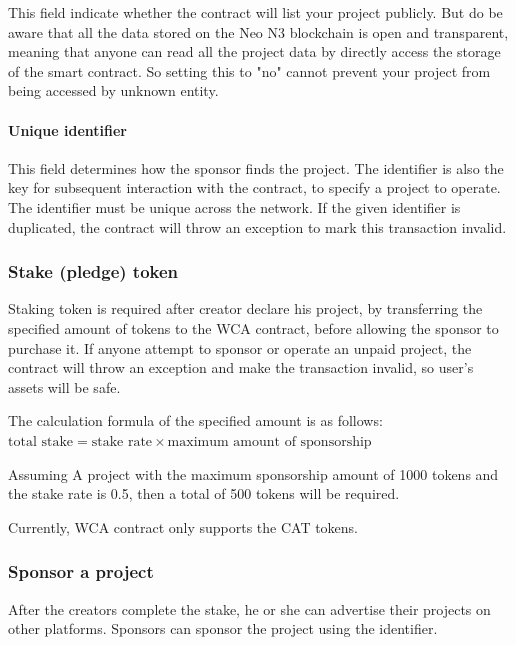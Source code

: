 \documentclass[12pt,a4paper]{article}
\begin{document}
    This field indicate whether the contract will list your project publicly.
    But do be aware that all the data stored on the Neo N3 blockchain is open and
    transparent, meaning that anyone can read all the project data by directly access
    the storage of the smart contract. So setting this to "no" cannot prevent your
    project from being accessed by unknown entity.

    \paragraph{Unique identifier}

    This field determines how the sponsor finds the project.
    The identifier is also the key for subsequent interaction with the contract,
    to specify a project to operate. The identifier must be unique across the network.
    If the given identifier is duplicated, the contract will throw an exception
    to mark this transaction invalid.

    \subsubsection{Stake (pledge) token}

    Staking token is required after creator declare his project,
    by transferring the specified amount of tokens to the WCA contract,
    before allowing the sponsor to purchase it. If anyone attempt to sponsor or operate
    an unpaid project, the contract will throw an exception and make the transaction invalid,
    so user's assets will be safe.

    The calculation formula of the specified amount is as follows:
    $\text{total stake} = \text{stake rate} \times \text{maximum amount of sponsorship}$

    Assuming A project with the maximum sponsorship amount of 1000 tokens and
    the stake rate is 0.5, then a total of 500 tokens will be required.

    Currently, WCA contract only supports the CAT tokens.

    \subsubsection{Sponsor a project}

    After the creators complete the stake, he or she can advertise their projects
    on other platforms. Sponsors can sponsor the project using the identifier.
\end{document}
